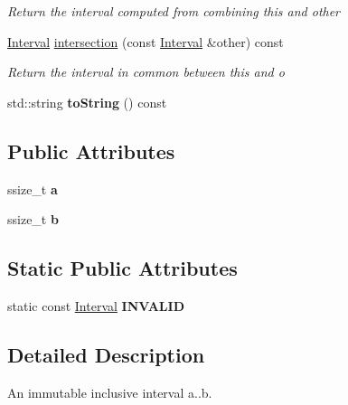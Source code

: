 \begin{DoxyCompactItemize}
\begin{DoxyCompactList}\small\item\em Return the interval computed from combining this and other \end{DoxyCompactList}\item 
\hyperlink{classantlr4_1_1misc_1_1Interval}{Interval} \hyperlink{classantlr4_1_1misc_1_1Interval_ad9afae5e2500a81bdbbbd118b4ce88d8}{intersection} (const \hyperlink{classantlr4_1_1misc_1_1Interval}{Interval} \&other) const
\begin{DoxyCompactList}\small\item\em Return the interval in common between this and o \end{DoxyCompactList}\item 
\mbox{\label{classantlr4_1_1misc_1_1Interval_a2dbba405744a0c403c030c4bb6559fe7}} 
std\+::string {\bfseries to\+String} () const
\end{DoxyCompactItemize}
\subsection*{Public Attributes}
\begin{DoxyCompactItemize}
\item 
\mbox{\label{classantlr4_1_1misc_1_1Interval_add9bbaf955b783d9625626ff6197c64b}} 
ssize\+\_\+t {\bfseries a}
\item 
\mbox{\label{classantlr4_1_1misc_1_1Interval_a8c0c01351c09a483a45ed6314e116d73}} 
ssize\+\_\+t {\bfseries b}
\end{DoxyCompactItemize}
\subsection*{Static Public Attributes}
\begin{DoxyCompactItemize}
\item 
\mbox{\label{classantlr4_1_1misc_1_1Interval_a7366643f3d6b777811588c4b7851e970}} 
static const \hyperlink{classantlr4_1_1misc_1_1Interval}{Interval} {\bfseries I\+N\+V\+A\+L\+ID}
\end{DoxyCompactItemize}


\subsection{Detailed Description}
An immutable inclusive interval a..b. 

